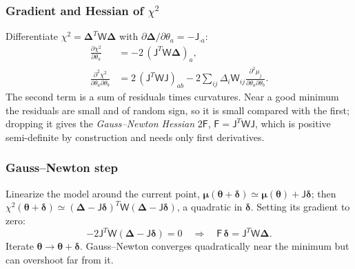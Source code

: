 \documentclass[11pt,a4paper]{article}
\numberwithin{equation}{section}
\theoremstyle{definition}
\theoremstyle{plain}
\theoremstyle{remark}
\numberwithin{algorithm}{section}
\newcommand{\sJ}{\mathsf J}
\newcommand{\sW}{\mathsf W}
\newcommand{\sF}{\mathsf F}
\newcommand{\vth}{\bm\theta}
\newcommand{\vD}{\bm\Delta}
\begin{document}
\subsubsection{Gradient and Hessian of \texorpdfstring{$\chi^2$}{chi-squared}}
Differentiate $\chi^2=\vD^T\sW\vD$ with $\partial\vD/\partial\theta_a=-\sJ_{\cdot a}$:
\begin{align}
\frac{\partial\chi^2}{\partial\theta_a}&=-2\,(\sJ^T\sW\vD)_a,\label{eq:gradchi}\\
\frac{\partial^2\chi^2}{\partial\theta_a\partial\theta_b}&=2\,(\sJ^T\sW\sJ)_{ab}-2\sum_{ij}\Delta_i\sW_{ij}\frac{\partial^2\mu_j}{\partial\theta_a\partial\theta_b}.\label{eq:hesschi}
\end{align}
The second term is a sum of residuals times curvatures. Near a good minimum the residuals are small and of random sign, so it is small compared with the first; dropping it gives the \emph{Gauss--Newton Hessian} $2\sF$, $\sF=\sJ^T\sW\sJ$, which is positive semi-definite by construction and needs only first derivatives.

\subsubsection{Gauss--Newton step}
Linearize the model around the current point, $\bm\mu(\vth+\bm\delta)\simeq\bm\mu(\vth)+\sJ\bm\delta$; then
$\chi^2(\vth+\bm\delta)\simeq(\vD-\sJ\bm\delta)^T\sW(\vD-\sJ\bm\delta)$, a quadratic in $\bm\delta$. Setting its gradient to zero:
\begin{equation}
-2\sJ^T\sW(\vD-\sJ\bm\delta)=0\quad\Longrightarrow\quad \sF\,\bm\delta=\sJ^T\sW\vD .
\label{eq:GN}
\end{equation}
Iterate $\vth\to\vth+\bm\delta$. Gauss--Newton converges quadratically near the minimum but can overshoot far from it.
\end{document}
